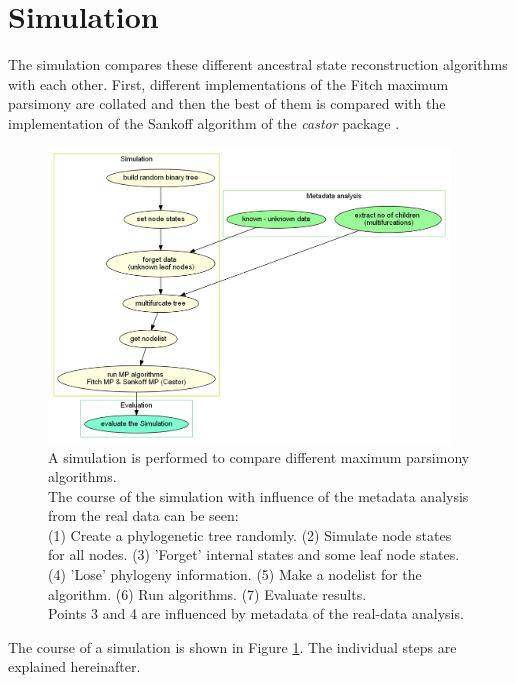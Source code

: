   \section{Simulation}\label{sec:methods - simulation}
    The simulation compares these different ancestral state reconstruction algorithms with each 
      other. First, different implementations of the Fitch maximum parsimony are collated and then the 
      best of them is compared with the implementation of the Sankoff algorithm of the \textit{castor} 
      package \cite{Louca2017}.

    \begin{figure}[h!]
      \centering
      \includegraphics[width=0.95\textwidth]{Figures/Workflow-Simulation.png}
      \caption{A simulation is performed to compare different maximum parsimony algorithms. \\
        The course of the simulation with influence of the metadata analysis from the real data can
          be seen: \\
        (1) Create a phylogenetic tree randomly. (2) Simulate node states for all nodes. (3) 
          'Forget' internal states and some leaf node states. (4) 'Lose' phylogeny information. (5) 
          Make a nodelist for the algorithm. (6) Run algorithms. (7) Evaluate results. \\
        Points 3 and 4 are influenced by metadata of the real-data analysis.}
      \label{fig:Simulation Workflow}
    \end{figure}
    The course of a simulation is shown in Figure \ref{fig:Simulation Workflow}. The individual steps 
      are explained hereinafter.

